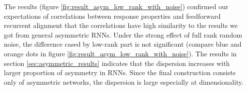 \documentclass[11pt]{article}
\begin{document}
	The results (figure \ref{fig:result_asym_low_rank_with_noise}) confirmed our expectations of correlations between response properties and feedforward recurrent alignment that the correlations have high similarity to the results we got from general asymmetric RNNs. Under the strong effect of full rank random noise, the difference cased by low-rank part is not significant (compare blue and orange dots in figure \ref{fig:result_asym_low_rank_with_noise}). The results in section \ref{sec:asymmetric_results} indicates that the dispersion increases with larger proportion of asymmetry in RNNs. Since the final construction consists only of asymmetric networks, the dispersion is large especially at dimensionality. 
		\vspace{-0.2cm}
\end{document}

